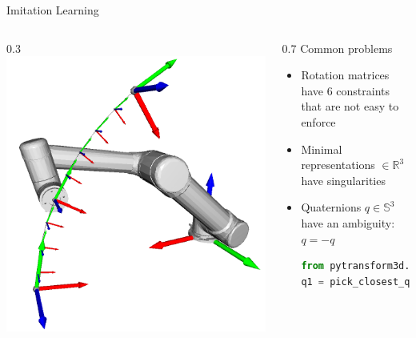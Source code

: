 \documentclass[14pt]{beamer}
\begin{document}
\begin{frame}[fragile]{Imitation Learning}
\begin{columns}
\begin{column}{0.3\textwidth}
\includegraphics[width=\textwidth]{images/movement_primitives_cart_dmp_ur5}
\end{column}
\begin{column}{0.7\textwidth}
Common problems
\begin{itemize}
\item Rotation matrices have 6 constraints that are not easy to enforce
\item Minimal representations $\in \mathbb{R}^3$ have singularities
\item Quaternions $q \in \mathbb{S}^3$ have an ambiguity: $q = -q$
\begin{lstlisting}[language=Python]
from pytransform3d.rotations import pick_closest_quaternion
q1 = pick_closest_quaternion(q1, q2)
\end{lstlisting}
\end{itemize}
\end{column}
\end{columns}
\end{frame}
\end{document}

